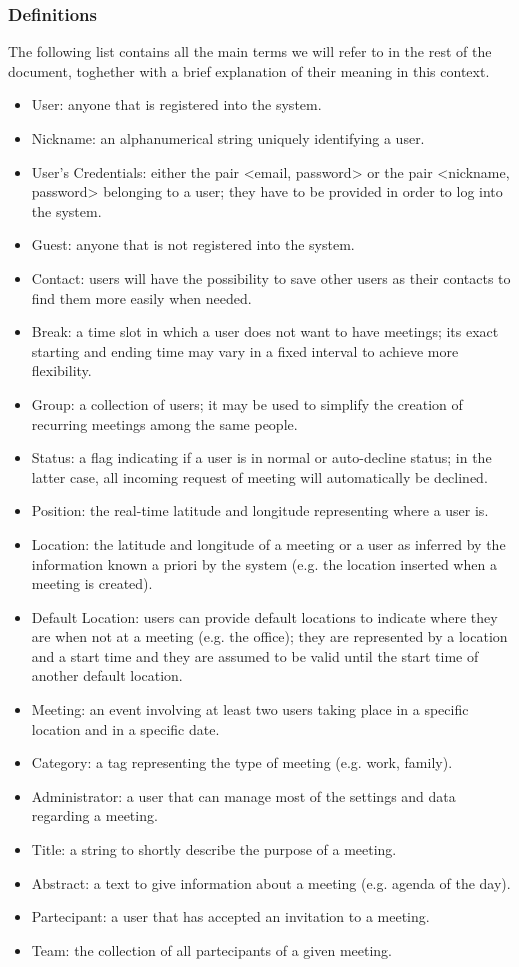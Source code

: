 \subsubsection{Definitions}

The following list contains all the main terms we will refer to in the rest of the document, toghether with a brief explanation of their meaning in this context.

\begin{itemize}
\item User: anyone that is registered into the system.
\item Nickname: an alphanumerical string uniquely identifying a user.
\item User’s Credentials: either the pair <email, password> or the pair <nickname, password> belonging to a user; they have to be provided in order to log into the system.
\item Guest: anyone that is not registered into the system.
\item Contact: users will have the possibility to save other users as their contacts to find them more easily when needed.
\item Break: a time slot in which a user does not want to have meetings; its exact starting and ending time may vary in a fixed interval to achieve more flexibility.
\item Group: a collection of users; it may be used to simplify the creation of recurring meetings among the same people.
\item Status: a flag indicating if a user is in normal or auto-decline status; in the latter case, all incoming request of meeting will automatically be declined.

\item Position: the real-time latitude and longitude representing where a user is.
\item Location: the latitude and longitude of a meeting or a user as inferred by the information known a priori by the system (e.g. the location inserted when a meeting is created).
\item Default Location: users can provide default locations to indicate where they are when not at a meeting (e.g. the office); they are represented by a location and a start time and they are assumed to be valid until the start time of another default location.

\item Meeting: an event involving at least two users taking place in a specific location and in a specific date.
\item Category: a tag representing the type of meeting (e.g. work, family).
\item Administrator: a user that can manage most of the settings and data regarding a meeting.
\item Title: a string to shortly describe the purpose of a meeting.
\item Abstract: a text to give information about a meeting (e.g. agenda of the day).
\item Partecipant: a user that has accepted an invitation to a meeting.
\item Team: the collection of all partecipants of a given meeting.


\end{itemize}
